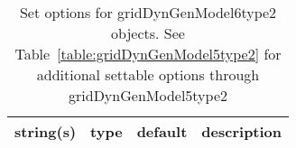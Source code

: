 \begin{table}[ht]
\centering
\begin{tabular}{p{5cm} c c p{7cm}}
\hline
string(s) & type & default & description \\
\hline
\hline
\end{tabular}
\caption{Set options for gridDynGenModel6type2 objects. See Table~\ref{table:gridDynGenModel5type2} for additional settable options through gridDynGenModel5type2}
\label{table:gridDynGenModel6type2}
\end{table}
